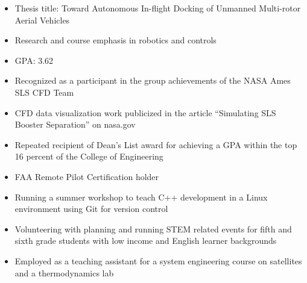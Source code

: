 
\begin{itemize}
  \item Thesis title: Toward Autonomous In-flight Docking of Unmanned Multi-rotor Aerial Vehicles
  \item Research and course emphasis in robotics and controls
  \item GPA: 3.62
\end{itemize}
\divider

\smallskip
{}

\par\smallskip
{}
\par\smallskip
{}

\begin{itemize}
    \item Recognized as a participant in the group achievements of the NASA Ames SLS CFD Team
    \item CFD data visualization work publicized in the article “Simulating SLS Booster Separation” on nasa.gov
    \item Repeated recipient of Dean’s List award for achieving a GPA within the top 16 percent of the College of Engineering
\end{itemize}

\begin{itemize}
    \item FAA Remote Pilot Certification holder
    \item Running a summer workshop to teach C++ development in a Linux environment using Git for version control
    \item Volunteering with planning and running STEM related events for fifth and sixth grade students with low income and English learner backgrounds 
    \item Employed as a teaching assistant for a system engineering course on satellites and a thermodynamics lab
\end{itemize}